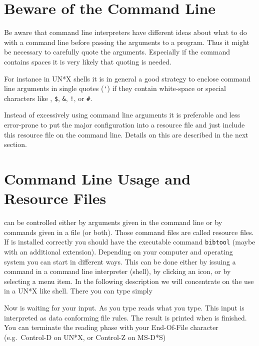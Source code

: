 \documentclass[11pt,a4paper]{scrbook}
\begin{document}
\section{Beware of the Command Line}

Be aware that command line interpreters have different ideas about what to do
with a command line before passing the arguments to a program. Thus it might
be necessary to carefully quote the arguments. Especially if the command
contains spaces it is very likely that quoting is needed.

For instance in UN*X shells it is in general a good strategy to enclose
command line arguments in single quotes (\verb|'|) if they contain white-space
or special characters like \texttt{}, \texttt{\$}, \texttt{\&},
\verb|!|, or \verb|#|.

Instead of excessively using command line arguments it is preferable and less
error-prone to put the major configuration into a resource file and just
include this resource file on the command line. Details on this are described
in the next section.

\section{Command Line Usage and Resource Files}

\BibTool{} can be controlled either by arguments given in the command line or
by commands given in a file (or both). Those command files are called resource
files. If \BibTool{} is installed correctly you should have the executable
command \texttt{bibtool} (maybe with an additional extension). Depending on
your computer and operating system you can start \BibTool{} in different ways.
This can be done either by issuing a command in a command line interpreter
(shell), by clicking an icon, or by selecting a menu item. In the following
description we will concentrate on the use in a UN*X like shell. There you can
type simply

\sh{}

Now \BibTool{} is waiting for your input. As you type \BibTool{} reads what
you type. This input is interpreted as data conforming \BibTeX{} file rules.
The result is printed when \BibTool{} is finished. You can terminate the
reading phase with your End-Of-File character (e.g.\ Control-D on UN*X, or
Control-Z on MS-D*S)
\end{document}
